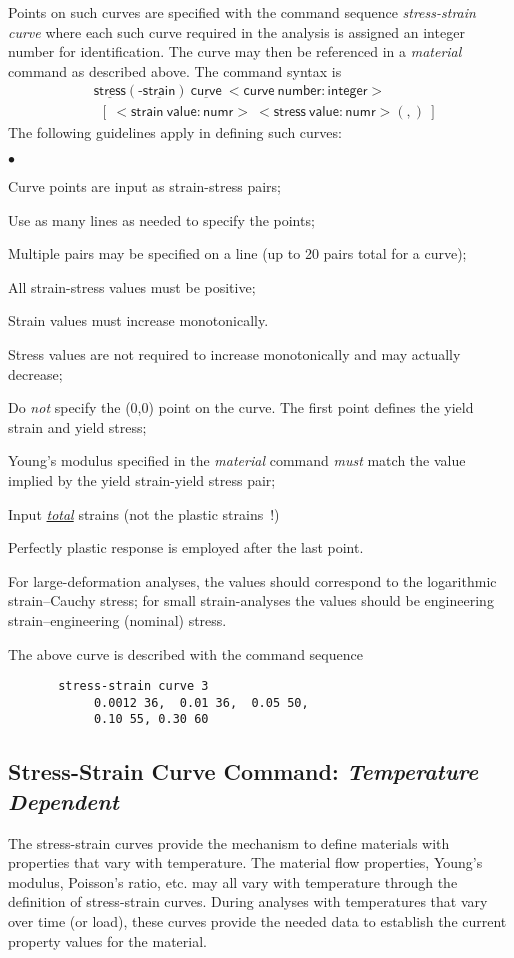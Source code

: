 \documentclass[11pt]{report}
\numberwithin{equation}{section}
\newcommand{\nin} {\noindent}
\newcommand{\ul} {\underline}
\newcommand{\hv} {\mathsf}   %
\newcommand{\ti}{\emph}
\newcommand{\squishlist}{
 \begin{list}{$\bullet$}
  { \setlength{\itemsep}{0pt}
     \setlength{\parsep}{3pt}
     \setlength{\topsep}{3pt}
     \setlength{\partopsep}{0pt}
     \setlength{\leftmargin}{1.5em}
     \setlength{\labelwidth}{1em}
     \setlength{\labelsep}{0.5em} } }
\newcommand{\squishend}{
  \end{list}  }
\begin{document}
Points on such curves are specified with the command sequence \ti{stress-strain
curve} where each such curve required in the analysis is assigned an integer
number for identification. The curve may then be referenced in a \ti{material}
command as described above. The command syntax is
\begin{align*}
&\hv{\ul{stress}(\mbox{-}\ul{strain})\ \ul{curve}\ <curve\ number:integer>} \\
&\hv{\ \ [\ <strain\ value:numr>\ <stress\ value:numr> (,) \ ]}
\end{align*}
\nin The following guidelines apply in defining such curves:
\small
\squishlist
\item Curve points are input as strain-stress pairs; 
\item Use as many lines as needed to specify the points; 
\item Multiple pairs may be specified on a line (up to 20 pairs total for a
curve);
\item All strain-stress values must be positive;
\item Strain values must increase monotonically. 
\item Stress values are not required to increase monotonically and may
actually decrease;
\item Do \ti{not} specify the (0,0) point on the curve. The first point defines the
yield strain and yield stress;
\item Young's modulus specified in the \ti{material} command \ti{must} match the value
implied by the yield strain-yield stress pair;
\item Input \ti{\ul{total}} strains (not the plastic
strains\ !)
\item Perfectly plastic response is employed after the last point.
\squishend
\normalsize
\nin For large-deformation analyses, the values should correspond to the logarithmic
strain--Cauchy stress; for small strain-analyses the values should be engineering
strain--engineering (nominal) stress.

The above curve is described with the command sequence
\small
\begin{verbatim}
       stress-strain curve 3
            0.0012 36,  0.01 36,  0.05 50,
            0.10 55, 0.30 60
\end{verbatim}
\normalsize
%
\subsection{Stress-Strain Curve Command: \ti{Temperature Dependent}}
\nin
The stress-strain curves provide the mechanism to define
materials with properties that vary with temperature. The material flow
properties, Young's modulus, Poisson's ratio, etc. 
may all vary with temperature through the definition of stress-strain
curves. During analyses with temperatures that vary over time (or load), these
curves provide the needed data to establish the current property values for the
material.
\end{document}
